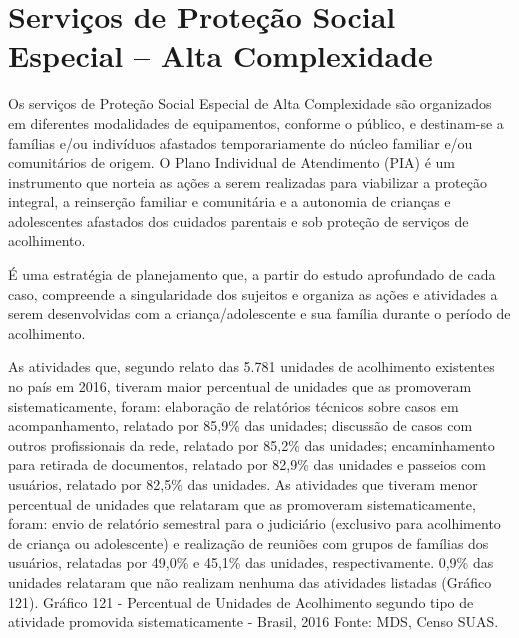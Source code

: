 \documentclass[
  brazilian]{report}
\begin{document}
\hypertarget{serviuxe7os-de-proteuxe7uxe3o-social-especial-alta-complexidade}{%
\section{Serviços de Proteção Social Especial -- Alta
Complexidade}\label{serviuxe7os-de-proteuxe7uxe3o-social-especial-alta-complexidade}}

Os serviços de Proteção Social Especial de Alta Complexidade são
organizados em diferentes modalidades de equipamentos, conforme o
público, e destinam-se a famílias e/ou indivíduos afastados
temporariamente do núcleo familiar e/ou comunitários de origem. O Plano
Individual de Atendimento (PIA) é um instrumento que norteia as ações a
serem realizadas para viabilizar a proteção integral, a reinserção
familiar e comunitária e a autonomia de crianças e adolescentes
afastados dos cuidados parentais e sob proteção de serviços de
acolhimento.

É uma estratégia de planejamento que, a partir do estudo aprofundado de
cada caso, compreende a singularidade dos sujeitos e organiza as ações e
atividades a serem desenvolvidas com a criança/adolescente e sua família
durante o período de acolhimento.

As atividades que, segundo relato das 5.781 unidades de acolhimento
existentes no país em 2016, tiveram maior percentual de unidades que as
promoveram sistematicamente, foram: elaboração de relatórios técnicos
sobre casos em acompanhamento, relatado por 85,9\% das unidades;
discussão de casos com outros profissionais da rede, relatado por 85,2\%
das unidades; encaminhamento para retirada de documentos, relatado por
82,9\% das unidades e passeios com usuários, relatado por 82,5\% das
unidades. As atividades que tiveram menor percentual de unidades que
relataram que as promoveram sistematicamente, foram: envio de relatório
semestral para o judiciário (exclusivo para acolhimento de criança ou
adolescente) e realização de reuniões com grupos de famílias dos
usuários, relatadas por 49,0\% e 45,1\% das unidades, respectivamente.
0,9\% das unidades relataram que não realizam nenhuma das atividades
listadas (Gráfico 121). Gráfico 121 - Percentual de Unidades de
Acolhimento segundo tipo de atividade promovida sistematicamente -
Brasil, 2016 Fonte: MDS, Censo SUAS.
\end{document}
